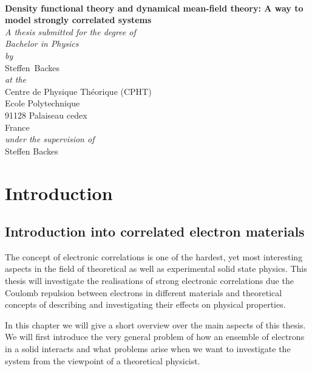 \documentclass[a4paper,openright,twoside,12pt]{book}
\numberwithin{equation}{section}
\newcommand*{\Lastname}{Backes}
\newcommand*{\Firstname}{Steffen}
\newcommand*{\Supervisor}{Steffen Backes}
\newcommand*{\Typ}{Bachelor in Physics}
\newcommand*{\Title}{Density functional theory and dynamical mean-field theory: A way to model strongly correlated systems}
\begin{document}
\begin{center}
\begin{minipage}{0.2\textwidth}
\end{minipage}\\
\vspace{1.5cm}
\Huge \textbf{ \Title } \\ 
\vspace{1.5cm}
\large 
\textit{A thesis submitted for the degree of\\
{\Typ}}\\
%
\vspace{0.5cm}
\large \textit{by}
\vspace{0.5cm}\\
\Large  \Firstname\ \Lastname
\vspace{0.5cm}\\
\large 
\textit{at the}
\vspace{0.5cm}\\
%
Centre de Physique Th\'eorique (CPHT) \\
Ecole Polytechnique \\
91128 Palaiseau cedex\\ 
France
%
\vspace{0.5cm}\\
\textit{under the supervision of}
\vspace{0.5cm}\\
%
\Large \Supervisor
\end{center}
\clearpage

\thispagestyle{empty}
\clearpage

\tableofcontents
\cleardoublepage

\pagestyle{fancy}


\chapter{Introduction}
\section{Introduction into correlated electron materials}
The concept of electronic correlations is one of the hardest, yet most interesting 
aspects in the field of theoretical as well as experimental solid state physics. 
This thesis will investigate the realisations of strong electronic correlations due
the Coulomb repulsion between electrons in different materials and theoretical concepts
of describing and investigating their effects on physical properties. 

In this chapter we will give a short overview over the main aspects of this thesis.
We will first introduce the very general problem of how an ensemble of electrons 
in a solid interacts and what problems arise when we want to investigate the system
from the viewpoint of a theoretical physicist.
\end{document}
